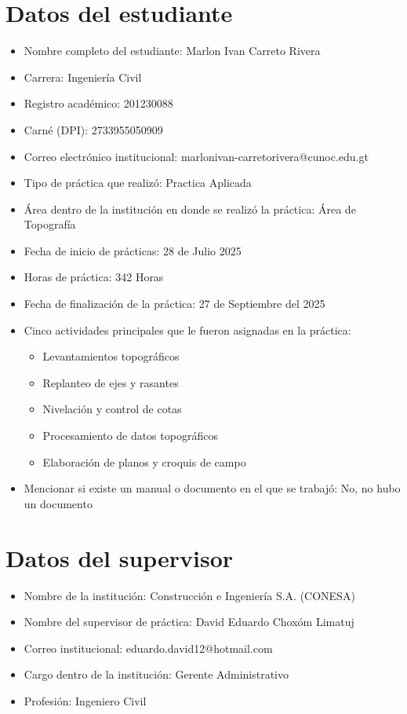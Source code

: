 \documentclass[12pt]{article}
\begin{document}
	\pagestyle{empty}
	
	
	\section*{Datos del estudiante}
	\begin{itemize}[label=$\blacksquare$]
		\item Nombre completo del estudiante:  Marlon Ivan Carreto Rivera
		\item Carrera: Ingeniería Civil
		\item Registro académico: 201230088
		\item Carné (DPI): 2733955050909 
		\item Correo electrónico institucional: marlonivan-carretorivera@cunoc.edu.gt
		\item Tipo de práctica que realizó: Practica Aplicada
		\item Área dentro de la institución en donde se realizó la práctica: Área de  Topografía 
		\item Fecha de inicio de prácticas: 28 de Julio 2025
		\item Horas de práctica: 342 Horas
		\item Fecha de finalización de la práctica: 27 de Septiembre del 2025
		\item Cinco actividades principales que le fueron asignadas en la práctica:
		\begin{itemize}
			\item Levantamientos topográficos
			\item Replanteo de ejes y rasantes
			\item Nivelación y control de cotas
			\item Procesamiento de datos topográficos
			\item Elaboración de planos y croquis de campo
		\end{itemize}
		
		\item Mencionar si existe un manual o documento en el que se trabajó: No, no hubo un documento
	\end{itemize}
	
	\section*{Datos del supervisor}
	\begin{itemize}[label=$\blacksquare$]
		\item Nombre de la institución: Construcción e Ingeniería S.A. (CONESA)
		\item Nombre del supervisor de práctica: David Eduardo Choxóm Limatuj
		\item Correo institucional: eduardo.david12@hotmail.com
		\item Cargo dentro de la institución: Gerente Administrativo 
		\item Profesión: Ingeniero Civil
	\end{itemize}
	
\end{document}

